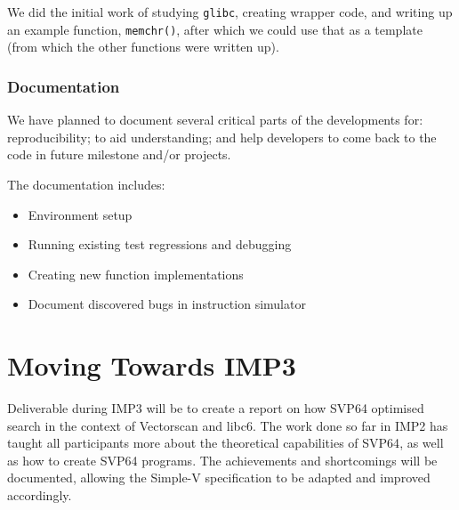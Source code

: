 We did the initial work of studying \texttt{glibc},
creating wrapper code, and writing up an example function, \texttt{memchr()},
after which we could use that as a template (from which the other functions were
written up).

\subsubsection{Documentation}

We have planned to document several critical parts of the developments for:
reproducibility; to aid understanding; and help developers to come back to
the code in future milestone and/or projects.
\par

The documentation includes:

\begin{itemize}
  \item Environment setup
  \item Running existing test regressions and debugging
  \item Creating new function implementations
  \item Document discovered bugs in instruction simulator
\end{itemize}

\section{Moving Towards IMP3}

Deliverable during \acrshort{IMP}3 will be to create a report on how \acrshort{SVP64} optimised
search in the context of Vectorscan and libc6. The work done so far in \acrshort{IMP}2
has taught all participants more about the theoretical capabilities
of \acrshort{SVP64}, as well as how to create \acrshort{SVP64} programs. The achievements and
shortcomings will be documented, allowing the Simple-V specification to
be adapted and improved accordingly.
